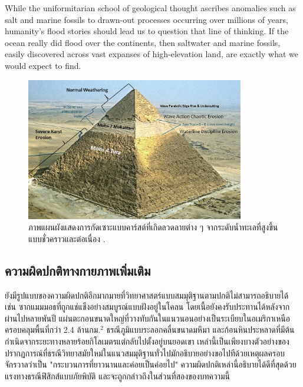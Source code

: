 \documentclass[10pt,twocolumn,letterpaper]{article}
\begin{document}
While the uniformitarian school of geological thought ascribes anomalies such as salt and marine fossils to drawn-out processes occurring over millions of years, humanity's flood stories should lead us to question that line of thinking. If the ocean really did flood over the continents, then saltwater and marine fossils, easily discovered across vast expanses of high-elevation land, are exactly what we would expect to find.

\begin{figure}[t]
\begin{center}
\includegraphics[width=0.85\textwidth]{khafre.jpg}
\end{center}
   \caption{ภาพแผนผังแสดงการกัดเซาะแบบคาร์สต์ที่เกิดลวดลายต่าง ๆ จากระดับน้ำทะเลที่สูงขึ้นแบบชั่วคราวและต่อเนื่อง \cite{27}.}
\label{fig:4}

\end{figure}

\subsection{ความผิดปกติทางกายภาพเพิ่มเติม}

ยังมีรูปแบบของความผิดปกติอีกมากมายที่วิทยาศาสตร์แบบสมมุติฐานตามปกติไม่สามารถอธิบายได้ เช่น ซากแมมมอธที่ถูกแช่แข็งอย่างสมบูรณ์แบบฝังอยู่ในโคลน โดยเนื้อยังคงรับประทานได้หลังจากผ่านไปหลายพันปี \cite{17,18,19} แผ่นตะกอนขนาดใหญ่ที่วางทับกันในแนวนอนอย่างเป็นระเบียบในอเมริกาเหนือ ครอบคลุมพื้นที่กว่า 2.4 ล้านกม.$^2$ \cite{21} ธรณีภูมิแบบระลอกคลื่นขนาดมหึมา \cite{22} และก้อนหินประหลาดที่มีต้นกำเนิดจากระยะทางหลายร้อยกิโลเมตรแต่กลับไปตั้งอยู่บนยอดเขา \cite{23,26} เหล่านี้เป็นเพียงบางตัวอย่างของปรากฏการณ์ที่ธรณีวิทยาสมัยใหม่ในแนวสมมุติฐานทั่วไปมักอธิบายอย่างขอไปทีด้วยเหตุผลครอบจักรวาลว่าเป็น "กระบวนการที่ยาวนานและค่อยเป็นค่อยไป" ความผิดปกติเหล่านี้อธิบายได้ดีที่สุดด้วยแรงทางธรณีฟิสิกส์แบบภัยพิบัติ และจะถูกกล่าวถึงในส่วนที่สองของบทความนี้
\end{document}
